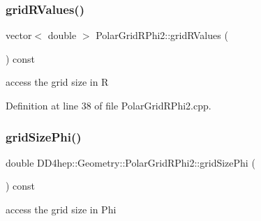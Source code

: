 \hypertarget{class_d_d4hep_1_1_geometry_1_1_polar_grid_r_phi2_a72dd879af2c16ba00714341c172b8b14}{}\label{class_d_d4hep_1_1_geometry_1_1_polar_grid_r_phi2_a72dd879af2c16ba00714341c172b8b14} 
\subsubsection{\texorpdfstring{grid\+R\+Values()}{gridRValues()}}
{\footnotesize\ttfamily vector$<$ double $>$ Polar\+Grid\+R\+Phi2\+::grid\+R\+Values (\begin{DoxyParamCaption}{ }\end{DoxyParamCaption}) const}



access the grid size in R 



Definition at line 38 of file Polar\+Grid\+R\+Phi2.\+cpp.

\hypertarget{class_d_d4hep_1_1_geometry_1_1_polar_grid_r_phi2_ae82915d0fc376012be61526b64e08ddc}{}\label{class_d_d4hep_1_1_geometry_1_1_polar_grid_r_phi2_ae82915d0fc376012be61526b64e08ddc} 
\subsubsection{\texorpdfstring{grid\+Size\+Phi()}{gridSizePhi()}}
{\footnotesize\ttfamily double D\+D4hep\+::\+Geometry\+::\+Polar\+Grid\+R\+Phi2\+::grid\+Size\+Phi (\begin{DoxyParamCaption}{ }\end{DoxyParamCaption}) const}



access the grid size in Phi 

\hypertarget{class_d_d4hep_1_1_geometry_1_1_polar_grid_r_phi2_afed7faf48368bf70d8edba36fd29b519}{}\label{class_d_d4hep_1_1_geometry_1_1_polar_grid_r_phi2_afed7faf48368bf70d8edba36fd29b519} 

